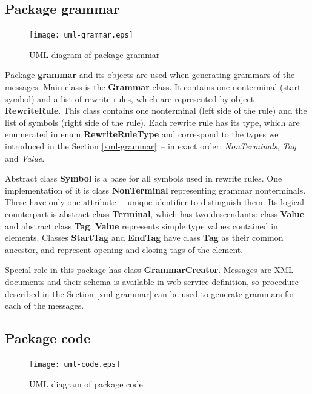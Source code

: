 \documentclass[12pt,notitlepage]{report}
\begin{document}
\subsection{Package grammar}

\begin{figure}[htb]
 \begin{center}
  \texttt{[image: uml-grammar.eps]}
 \end{center}
 \caption{UML diagram of package grammar}
 \label{uml-grammar}
\end{figure}

Package \textbf{grammar} and its objects are used when generating grammars of the messages. Main class is the \textbf{Grammar} class. It contains one nonterminal (start symbol) and a list of rewrite rules, which are represented by object \textbf{RewriteRule}. This class contains one nonterminal (left side of the rule) and the list of symbols (right side of the rule). Each rewrite rule has its type, which are enumerated in enum \textbf{RewriteRuleType} and correspond to the types we introduced in the Section \ref{xml-grammar}~-- in exact order: \textit{NonTerminals}, \textit{Tag} and \textit{Value}.

Abstract class \textbf{Symbol} is a base for all symbols used in rewrite rules. One implementation of it is class \textbf{NonTerminal} representing grammar nonterminals. These have only one attribute~-- unique identifier to distinguish them. Its logical counterpart is abstract class \textbf{Terminal}, which has two descendants: class \textbf{Value} and abstract class \textbf{Tag}. \textbf{Value} represents simple type values contained in elements. Classes \textbf{StartTag} and \textbf{EndTag} have class \textbf{Tag} as their common ancestor, and represent opening and closing tags of the element.

Special role in this package has class \textbf{GrammarCreator}. Messages are XML documents and their schema is available in web service definition, so procedure described in the Section \ref{xml-grammar} can be used to generate grammars for each of the messages.

\subsection{Package code}
\label{package-code}

\begin{figure}[htb]
 \begin{center}
  \texttt{[image: uml-code.eps]}
 \end{center}
 \caption{UML diagram of package code}
 \label{uml-code}
\end{figure}
\end{document}
